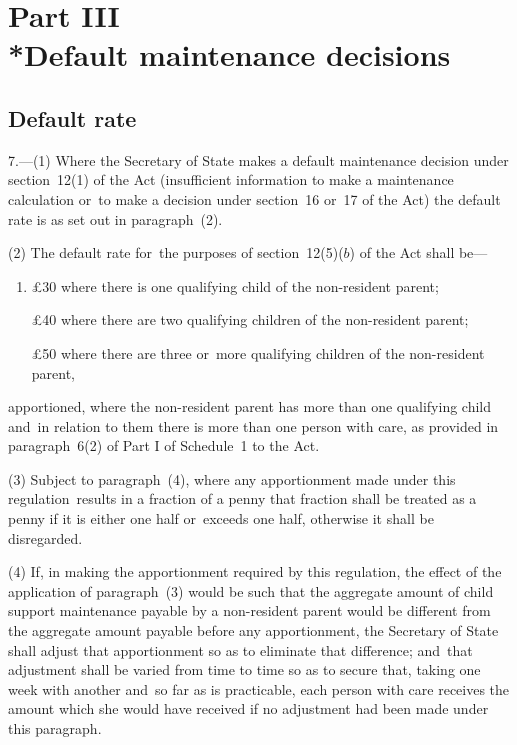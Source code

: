 \documentclass[12pt,a4paper]{article}
\begin{document}

\section[Part III --- Default maintenance decisions]{Part III\\*Default maintenance decisions}

\renewcommand\parthead{--- Part III}

\subsection[7. Default rate]{Default rate}

7.---(1)  Where the Secretary of State makes a default maintenance decision under section~12(1) of the Act (insufficient information to make a maintenance calculation or~to make a decision under section~16 or~17 of the Act) the default rate is as set out in paragraph~(2).

(2) The default rate for~the purposes of section~12(5)($b$)  of the Act shall be—
\begin{enumerate}\item[]
    £30 where there is one qualifying child of the non-resident parent;

    £40 where there are two qualifying children of the non-resident parent;

    £50 where there are three or~more qualifying children of the non-resident parent, 
\end{enumerate}
    apportioned, where the non-resident parent has more than one qualifying child and~in relation to them there is more than one person with care, as provided in paragraph~6(2) of Part I of Schedule~1 to the Act. 

(3) Subject to paragraph~(4), where any apportionment made under this regulation~results in a fraction of a penny that fraction shall be treated as a penny if it is either one half or~exceeds one half, otherwise it shall be disregarded.

(4) If, in making the apportionment required by this regulation, the effect of the application of paragraph~(3) would be such that the aggregate amount of child support maintenance payable by a non-resident parent would be different from the aggregate amount payable before any apportionment, the Secretary of State shall adjust that apportionment so as to eliminate that difference; and~that adjustment shall be varied from time to time so as to secure that, taking one week with another and~so far as is practicable, each person with care receives the amount which she would have received if no adjustment had been made under this paragraph.
\end{document}
